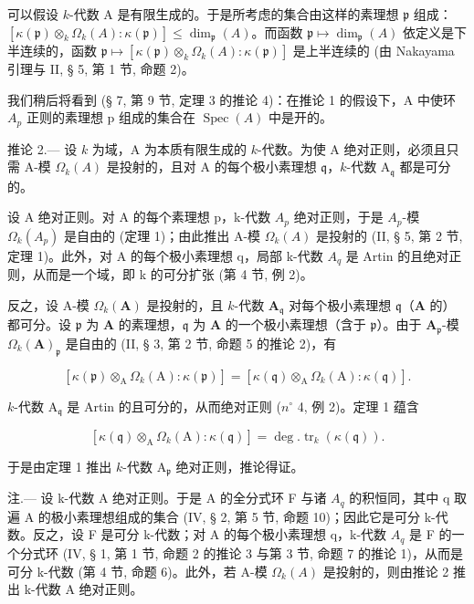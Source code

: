 可以假设 \(k\)-代数 A 是有限生成的。于是所考虑的集合由这样的素理想 \(\mathfrak{p}\) 组成：\([\kappa(\mathfrak{p}) \otimes_k \Omega_k(A) : \kappa(\mathfrak{p})] \leqslant \dim_{\mathfrak{p}}(A)\)。而函数 \(\mathfrak{p} \mapsto \dim_{\mathfrak{p}}(A)\) 依定义是下半连续的，函数 \(\mathfrak{p} \mapsto [\kappa(\mathfrak{p}) \otimes_k \Omega_k(A) : \kappa(\mathfrak{p})]\) 是上半连续的 (由 Nakayama 引理与 II, § 5, 第 1 节, 命题 2)。

我们稍后将看到 (§ 7, 第 9 节, 定理 3 的推论 4)：在推论 1 的假设下，A 中使环 \(A_{p}\) 正则的素理想 p 组成的集合在 \(\operatorname{Spec}(A)\) 中是开的。

推论 2.--- 设 \(k\) 为域，A 为本质有限生成的 \(k\)-代数。为使 A 绝对正则，必须且只需 A-模 \(\Omega_{k}(A)\) 是投射的，且对 A 的每个极小素理想 \(\mathfrak{q}\)，\(k\)-代数 \(\mathrm{A}_{\mathfrak{q}}\) 都是可分的。

设 A 绝对正则。对 A 的每个素理想 p，k-代数 \(A_{p}\) 绝对正则，于是 \(A_{p}\)-模 \(\Omega_{k}(A_{p})\) 是自由的 (定理 1)；由此推出 A-模 \(\Omega_{k}(A)\) 是投射的 (II, § 5, 第 2 节, 定理 1)。此外，对 A 的每个极小素理想 q，局部 k-代数 \(A_{q}\) 是 Artin 的且绝对正则，从而是一个域，即 k 的可分扩张 (第 4 节, 例 2)。

反之，设 A-模 \(\Omega_{k}(\mathbf{A})\) 是投射的，且 \(k\)-代数 \(\mathbf{A}_{\mathfrak{q}}\) 对每个极小素理想 \(\mathfrak{q}\)（\(\mathbf{A}\) 的）都可分。设 \(\mathfrak{p}\) 为 \(\mathbf{A}\) 的素理想，\(\mathfrak{q}\) 为 \(\mathbf{A}\) 的一个极小素理想（含于 \(\mathfrak{p}\)）。由于 \(\mathbf{A}_{\mathfrak{p}}\)-模 \(\Omega_{k}(\mathbf{A})_{\mathfrak{p}}\) 是自由的 (II, § 3, 第 2 节, 命题 5 的推论 2)，有

\[
[ \kappa (\mathfrak {p}) \otimes_ {\mathrm{A}} \Omega_ {k} (\mathrm{A}): \kappa (\mathfrak {p}) ] = [ \kappa (\mathfrak {q}) \otimes_ {\mathrm{A}} \Omega_ {k} (\mathrm{A}): \kappa (\mathfrak {q}) ].
\]

\(k\)-代数 \(\mathrm{A}_{\mathfrak{q}}\) 是 Artin 的且可分的，从而绝对正则 (\(n^{\circ}\) 4, 例 2)。定理 1 蕴含

\[
[ \kappa (\mathfrak {q}) \otimes_ {\mathrm{A}} \Omega_ {k} (\mathrm{A}): \kappa (\mathfrak {q}) ] = \deg . \operatorname{tr} _ {k} (\kappa (\mathfrak {q})).
\]

于是由定理 1 推出 \(k\)-代数 \(\mathrm{A}_{\mathfrak{p}}\) 绝对正则，推论得证。

注.--- 设 k-代数 A 绝对正则。于是 A 的全分式环 F 与诸 \(A_{q}\) 的积恒同，其中 q 取遍 A 的极小素理想组成的集合 (IV, § 2, 第 5 节, 命题 10)；因此它是可分 k-代数。反之，设 F 是可分 k-代数；对 A 的每个极小素理想 q，k-代数 \(A_{q}\) 是 F 的一个分式环 (IV, § 1, 第 1 节, 命题 2 的推论 3 与第 3 节, 命题 7 的推论 1)，从而是可分 k-代数 (第 4 节, 命题 6)。此外，若 A-模 \(\Omega_{k}(A)\) 是投射的，则由推论 2 推出 k-代数 A 绝对正则。

